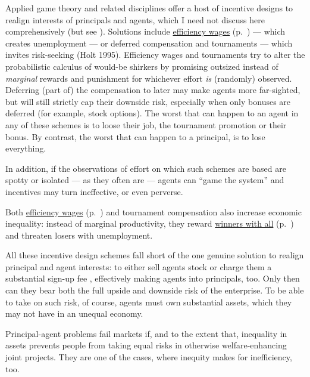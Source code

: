 Applied game theory and related disciplines offer a host of incentive designs to realign interests of principals and agents, which I need not discuss here comprehensively (but see \citealt{Tirole2006}). 
Solutions include \hyperref[sec:efficiency-wages]{efficiency wages} (p.~\pageref{sec:efficiency-wages}) --- which creates unemployment --- or deferred compensation and tournaments --- which invites risk-seeking (Holt 1995). 
Efficiency wages and tournaments try to alter the probabilistic calculus of would-be shirkers by promising outsized instead of \emph{marginal} rewards and punishment for whichever effort \emph{is} (randomly) observed. 
Deferring (part of) the compensation to later may make agents more far-sighted, but will still strictly cap their downside risk, especially when only bonuses are deferred (for example, stock options). 
The worst that can happen to an agent in any of these schemes is to loose their job, the tournament promotion or their bonus. 
By contrast, the worst that can happen to a principal, is to lose everything.

In addition, if the observations of effort on which such schemes are based are spotty or isolated --- as they often are --- agents can ``game the system'' and incentives may turn ineffective, or even perverse. 

Both \hyperref[sec:efficiency-wages]{efficiency wages} (p.~\pageref{sec:efficiency-wages}) and tournament compensation also increase economic inequality: 
instead of marginal productivity, they reward \hyperref[sec:winner-take-all]{winners with all}  (p.~\pageref{sec:winner-take-all}) and threaten losers with unemployment.

All these incentive design schemes fall short of the one genuine solution to realign principal and agent interests: to either sell agents stock or charge them a substantial sign-up fee \citep{Tirole2006}, effectively making agents into principals, too. 
Only then can they bear both the full upside and downside risk of the enterprise. 
To be able to take on such risk, of course, agents must own substantial assets, which they may not have in an unequal economy.

Principal-agent problems fail markets if, and to the extent that, inequality in assets prevents people from taking equal risks in otherwise welfare-enhancing joint projects. 
They are one of the cases, where inequity makes for inefficiency, too. %

